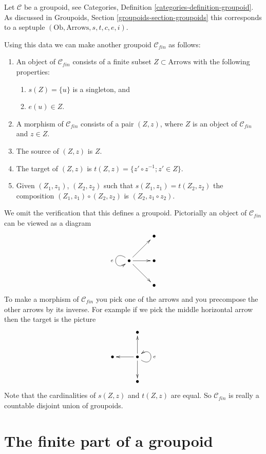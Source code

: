 \noindent
Let $\mathcal{C}$ be a groupoid, see
Categories, Definition \ref{categories-definition-groupoid}.
As discussed in
Groupoids, Section \ref{groupoids-section-groupoids}
this corresponds to a septuple $(\text{Ob}, \text{Arrows}, s, t, c, e, i)$.

\medskip\noindent
Using this data we can make another groupoid $\mathcal{C}_{fin}$
as follows:
\begin{enumerate}
\item An object of $\mathcal{C}_{fin}$ consists of a finite subset
$Z \subset \text{Arrows}$ with the following properties:
\begin{enumerate}
\item $s(Z) = \{u\}$ is a singleton, and
\item $e(u) \in Z$.
\end{enumerate}
\item A morphism of $\mathcal{C}_{fin}$ consists of a pair
$(Z, z)$, where $Z$ is an object of $\mathcal{C}_{fin}$ and
$z \in Z$.
\item The source of $(Z, z)$ is $Z$.
\item The target of $(Z, z)$ is $t(Z, z) = \{z' \circ z^{-1}; z' \in Z\}$.
\item Given $(Z_1, z_1)$, $(Z_2, z_2)$ such that $s(Z_1, z_1) = t(Z_2, z_2)$
the composition $(Z_1, z_1) \circ (Z_2, z_2)$ is $(Z_2, z_1 \circ z_2)$.
\end{enumerate}
We omit the verification that this defines a groupoid.
Pictorially an object of $\mathcal{C}_{fin}$ can be viewed
as a diagram
$$
\xymatrix{
& \bullet \\
\bullet \ar@(ul,dl)[]_e \ar[ru] \ar[r] \ar[rd] & \bullet \\
& \bullet
}
$$
To make a morphism of $\mathcal{C}_{fin}$ you pick one of the arrows
and you precompose the other arrows by its inverse. For example if we pick
the middle horizontal arrow then the target is the picture
$$
\xymatrix{
& \bullet \\
\bullet & \bullet \ar[l] \ar[u] \ar@(dr,ur)[]_e \ar[d] \\
& \bullet
}
$$
Note that the cardinalities of $s(Z, z)$ and $t(Z, z)$ are equal.
So $\mathcal{C}_{fin}$ is really a countable disjoint union of
groupoids.




\section{The finite part of a groupoid}
\label{section-finite-part-groupoid}

